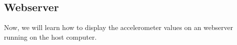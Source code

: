 \subsection{Webserver}
Now, we will learn how to display the accelerometer values on an webserver running
on the host computer.






